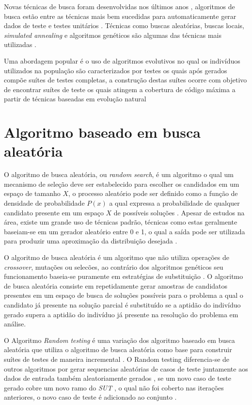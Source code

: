 \documentclass[
	12pt,				%
	oneside,			%
	a4paper,			%
	english,			%
	brazil				%
	]{abntex2ppgsi}
\begin{document}
Novas técnicas de busca foram desenvolvidas nos últimos anos \cite{rojas2017b}, algoritmos de busca estão entre as técnicas mais bem sucedidas para automaticamente gerar dados de teste e testes unitários \cite{rojas2017b}. Técnicas como buscas aleatórias, buscas locais, \textit{simulated annealing} e algoritmos genéticos são algumas das técnicas mais utilizadas \cite{rojas2017b}.

Uma abordagem popular é o uso de algoritmos evolutivos no qual os indivíduos utilizados na população são caracterizados por testes os quais  após gerados compõe suítes de testes completas, a construção destas suítes ocorre com objetivo de encontrar suítes de teste os quais atingem a cobertura de código máxima a partir de técnicas baseadas em evolução natural \cite{Campos2017}

\section{Algoritmo baseado em busca aleatória}

O algoritmo de busca aleatória, ou \textit{random search},  é um algoritmo o qual um mecanismo de seleção deve ser estabelecido para escolher os candidados em um espaço de tamanho $X$, o processo aleatório pode ser definido como a função de densidade de probabilidade $P(x)$ a qual expressa a probabilidade de qualquer candidato presente em um espaço $X$ de possíveis soluções \cite{Karnopp63}. Apesar de estudos na área, existe um grande uso de técnicas padrão, técnicas como estas geralmente baseiam-se em um gerador aleatório entre 0 e 1, o qual a saída pode ser utilizada para produzir uma aproximação da distribuição desejada  \cite{Karnopp63}.

O algoritmo de busca aleatória é um algoritmo que não utiliza operações de \textit{crossover}, mutações ou selecões, ao contrário dos algoritmos genéticos seu funcionamento baseia-se puramente em estratégias de substituição \cite{Campos2017}. O algoritmo de busca aleatória consiste em repetidamente gerar amostras de candidatos presentes em um espaço de busca de soluções possíveis para o problema a qual o candidato já presente na solução parcial é substituído se a aptidão do indivíduo gerado supera a aptidão do indivíduo já presente na resolução do problema em análise. \cite{Campos2017}

O Algoritmo \textit{Random testing} é uma variação dos algoritmo baseado em busca aleatória que utiliza o algoritmo de busca aleatória como base para construir suítes de testes de maneira incremental \cite{Campos2017}. O Random testing diferencia-se de outros algoritmos por gerar sequencias aleatórias de casos de teste juntamente aos dados de entrada também  aleatoriamente gerados \cite{shamriski20151115}, se um novo caso de teste gerado cobre um novo ramo do \textit{SUT} , o qual não foi coberto nas iterações anteriores, o novo caso de teste é adicionado ao conjunto \cite{shamriski20151115}.
\end{document}
